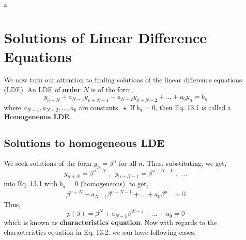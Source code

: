 z\documentclass[a4paper,12pt,twoside]{book}
\newcommand{\nll}[0]{\newline\newline}
\begin{document}
\chapter{Solutions of Linear Difference Equations}
We now turn our attention to finding solutions of the linear difference equations (LDE). An LDE of \textbf{order $N$} is of the form,
\begin{equation}
    y_{n+N} + a_{N-1}y_{n+N-1} + a_{N-2}y_{n+N-2} + \dots + a_0y_n = b_n
\end{equation}
where $a_{N-1},a_{N-2},\dots,a_0$ are constants. 
\nll
$\boxed{\star}$ If $b_n = 0$, then Eq. 13.1 is called a \textbf{Homogeneous LDE}.
\section{Solutions to homogeneous LDE}
We seek solutions of the form $\boxed{y_n = \beta^n}$ for all $n$. Thus, substituting, we get,
\[ y_{n+N} = \beta^{n+N}\;,\;\; y_{n+N-1} = \beta^{n+N-1}\;,\;\;\dots \]
into Eq. 13.1 with $b_n= 0$ (homogeneous), to get,
\begin{equation*}
\begin{split}
    \beta^{n+N} + a_{N-1} \beta^{n+N-1} + \dots + a_0 \beta^n &= 0
\end{split}
\end{equation*}
Thus,
\begin{equation}
    \boxed{p(\beta) = \beta^N + a_{N-1} \beta^{N-1} + \dots + a_0 = 0}
\end{equation}
which is known as \textbf{characteristics equation}. 
\nll
Now with regards to the characteristics equation in Eq. 13.2, we can have following cases,
\end{document}
